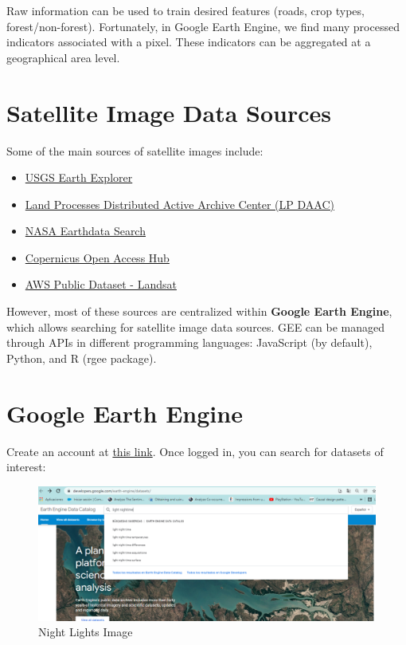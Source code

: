 \documentclass[
  12pt,
]{book}
\begin{document}
Raw information can be used to train desired features (roads, crop types, forest/non-forest). Fortunately, in Google Earth Engine, we find many processed indicators associated with a pixel. These indicators can be aggregated at a geographical area level.

\hypertarget{satellite-image-data-sources}{%
\section{Satellite Image Data Sources}\label{satellite-image-data-sources}}

Some of the main sources of satellite images include:

\begin{itemize}
\item
  \href{http://earthexplorer.usgs.gov/}{USGS Earth Explorer}
\item
  \href{https://lpdaacsvc.cr.usgs.gov/appeears/}{Land Processes Distributed Active Archive Center (LP DAAC)}
\item
  \href{https://search.earthdata.nasa.gov/search}{NASA Earthdata Search}
\item
  \href{https://scihub.copernicus.eu/}{Copernicus Open Access Hub}
\item
  \href{https://aws.amazon.com/public-data-sets/landsat/}{AWS Public Dataset - Landsat}
\end{itemize}

However, most of these sources are centralized within \textbf{Google Earth Engine}, which allows searching for satellite image data sources. GEE can be managed through APIs in different programming languages: JavaScript (by default), Python, and R (rgee package).

\hypertarget{google-earth-engine}{%
\section{Google Earth Engine}\label{google-earth-engine}}

Create an account at \href{https://earthengine.google.com/}{this link}. Once logged in, you can search for datasets of interest:

\begin{figure}
\centering
\includegraphics{Recursos/01_Session1/01_lights.png}
\caption{Night Lights Image}
\end{figure}
\end{document}
